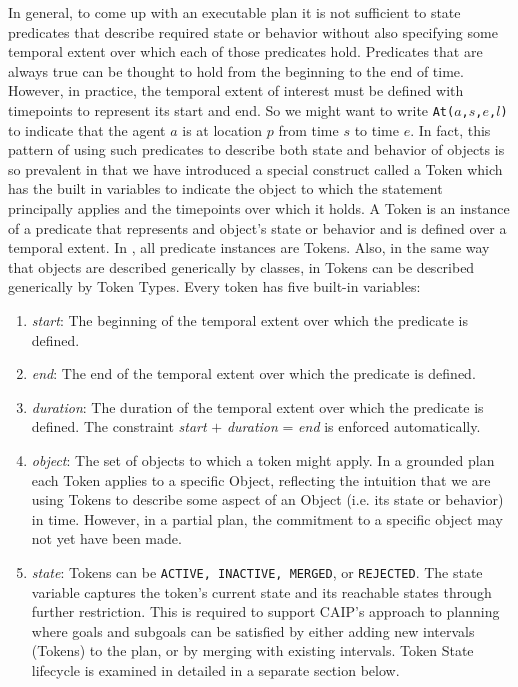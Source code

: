 \begin{description}
  In general, to come up with an executable plan it is not sufficient
  to state predicates that describe required state or behavior without
  also specifying some temporal extent over which each of those
  predicates hold. Predicates that are always true can be thought to
  hold from the beginning to the end of time. However, in practice,
  the temporal extent of interest must be defined with timepoints to
  represent its start and end. So we might want to write
  \texttt{At($a$,$s$,$e$,$l$)} to indicate that the agent $a$ is at
  location $p$ from time $s$ to time $e$. In fact, this pattern of
  using such predicates to describe both state and behavior of objects
  is so prevalent in \eu that we have introduced a special construct
  called a Token which has the built in variables to indicate the
  object to which the statement principally applies and the timepoints
  over which it holds. A Token is an instance of a predicate that
  represents and object's state or behavior and is defined over a
  temporal extent. In \eu, all predicate instances are Tokens. Also,
  in the same way that objects are described generically by classes,
  in \eu Tokens can be described generically by Token Types. Every
  token has five built-in variables:

  \begin{enumerate}

  \item \textit {start}: The beginning of the temporal extent over
    which the predicate is defined.

  \item \textit {end}: The end of the temporal extent over which the
    predicate is defined.

  \item \textit {duration}: The duration of the temporal extent over
    which the predicate is defined. The constraint \textit{start} $+$
    \textit{duration} = \textit{end} is enforced automatically.

  \item \textit{object}: The set of objects to which a token might
    apply. In a grounded plan each Token applies to a specific Object,
    reflecting the intuition that we are using Tokens to describe some
    aspect of an Object (i.e. its state or behavior) in time. However,
    in a partial plan, the commitment to a specific object may not yet
    have been made.

  \item \textit{state}: Tokens can be \texttt{ACTIVE, INACTIVE,
      MERGED}, or \texttt{REJECTED}. The state variable captures the
    token's current state and its reachable states through further
    restriction.  This is required to support CAIP's approach to
    planning where goals and subgoals can be satisfied by either
    adding new intervals (Tokens) to the plan, or by merging with
    existing intervals. Token State lifecycle is examined in detailed
    in a separate section below.


\end{enumerate}
\end{description}
